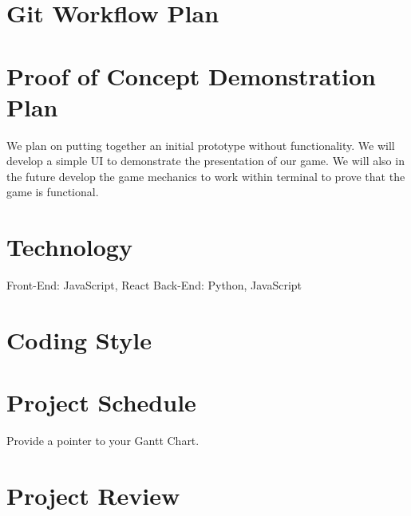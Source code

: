\documentclass{article}
\begin{document}
\section{Git Workflow Plan}

\section{Proof of Concept Demonstration Plan}
We plan on putting together an initial prototype without functionality. We will develop a simple UI to demonstrate the presentation of our game. We will also in the future develop the game mechanics to work within terminal to prove that the game is functional.

\section{Technology}
Front-End: JavaScript, React
Back-End: Python, JavaScript

\section{Coding Style}


\section{Project Schedule}

Provide a pointer to your Gantt Chart.

\section{Project Review}
\end{document}
